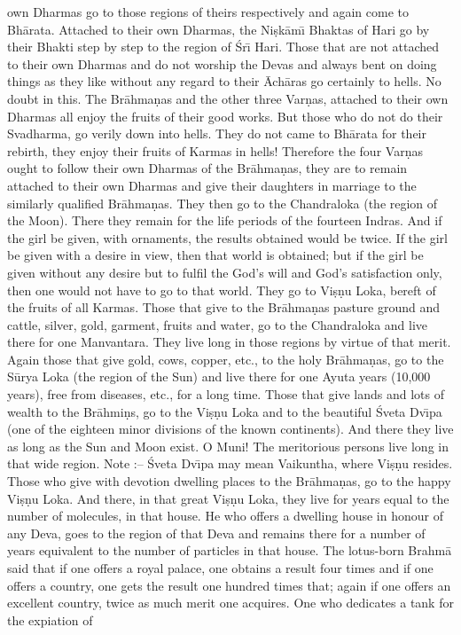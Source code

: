 own Dharmas go to those regions of theirs respectively and again come to Bh\=arata. Attached to their own Dharmas, the Ni\d{s}k\=am\={\i} Bhaktas of Hari go by their Bhakti step by step to the region of \'Sr\={\i} Hari. Those that are not attached to their own Dharmas and do not worship the Devas and always bent on doing things as they like without any regard to their \=Ach\=aras go certainly to hells. No doubt in this. The Br\=ahma\d{n}as and the other three Var\d{n}as, attached to their own Dharmas all enjoy the fruits of their good works. But those who do not do their Svadharma, go verily down into hells. They do not came to Bh\=arata for their rebirth, they enjoy their fruits of Karmas in hells! Therefore the four Var\d{n}as ought to follow their own Dharmas of the Br\=ahma\d{n}as, they are to remain attached to their own Dharmas and give their daughters in marriage to the similarly qualified Br\=ahma\d{n}as. They then go to the Chandraloka (the region of the Moon). There they remain for the life periods of the fourteen Indras. And if the girl be given, with ornaments, the results obtained would be twice. If the girl be given with a desire in view, then that world is obtained; but if the girl be given without any desire but to fulfil the God's will and God's satisfaction only, then one would not have to go to that world. They go to Vi\d{s}\d{n}u Loka, bereft of the fruits of all Karmas. Those that give to the Br\=ahma\d{n}as pasture ground and cattle, silver, gold, garment, fruits and water, go to the Chandraloka and live there for one Manvantara. They live long in those regions by virtue of that merit. Again those that give gold, cows, copper, etc., to the holy Br\=ahma\d{n}as, go to the S\=urya Loka (the region of the Sun) and live there for one Ayuta years (10,000 years), free from diseases, etc., for a long time. Those that give lands and lots of wealth to the Br\=ahmi\d{n}s, go to the Vi\d{s}\d{n}u Loka and to the beautiful \'Sveta Dv\={\i}pa (one of the eighteen minor divisions of the known continents). And there they live as long as the Sun and Moon exist. O Muni! The meritorious persons live long in that wide region. Note :-- \'Sveta Dv\={\i}pa may mean Vaikuntha, where Vi\d{s}\d{n}u resides. Those who give with devotion dwelling places to the Br\=ahma\d{n}as, go to the happy Vi\d{s}\d{n}u Loka. And there, in that great Vi\d{s}\d{n}u Loka, they live for years equal to the number of molecules, in that house. He who offers a dwelling house in honour of any Deva, goes to the region of that Deva and remains there for a number of years equivalent to the number of particles in that house. The lotus-born Brahm\=a said that if one offers a royal palace, one obtains a result four times and if one offers a country, one gets the result one hundred times that; again if one offers an excellent country, twice as much merit one acquires. One who dedicates a tank for the expiation of

